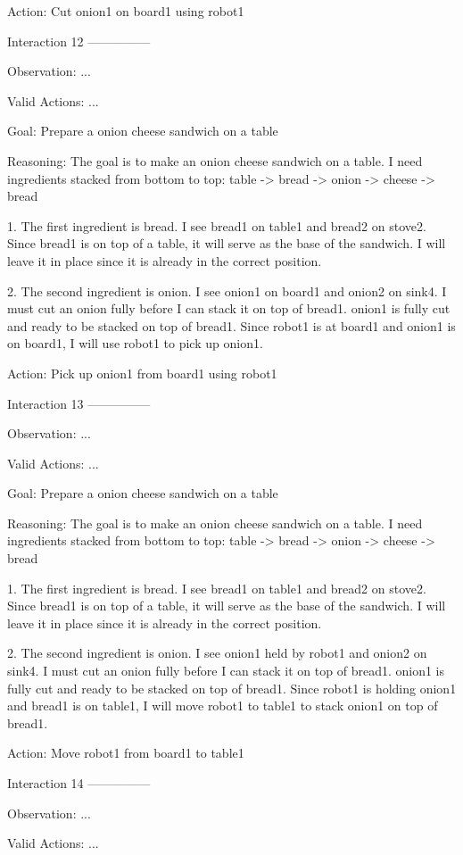 Action: Cut onion1 on board1 using robot1


Interaction 12
---------------


Observation:
...

Valid Actions:
...

Goal: Prepare a onion cheese sandwich on a table


Reasoning: The goal is to make an onion cheese sandwich on a table. I need ingredients stacked from bottom to top: table -> bread -> onion -> cheese -> bread

1. The first ingredient is bread. I see bread1 on table1 and bread2 on stove2. Since bread1 is on top of a table, it will serve as the base of the sandwich. I will leave it in place since it is already in the correct position.

2. The second ingredient is onion. I see onion1 on board1 and onion2 on sink4. I must cut an onion fully before I can stack it on top of bread1. onion1 is fully cut and ready to be stacked on top of bread1. Since robot1 is at board1 and onion1 is on board1, I will use robot1 to pick up onion1.

Action: Pick up onion1 from board1 using robot1


Interaction 13
---------------


Observation:
...

Valid Actions:
...

Goal: Prepare a onion cheese sandwich on a table


Reasoning: The goal is to make an onion cheese sandwich on a table. I need ingredients stacked from bottom to top: table -> bread -> onion -> cheese -> bread

1. The first ingredient is bread. I see bread1 on table1 and bread2 on stove2. Since bread1 is on top of a table, it will serve as the base of the sandwich. I will leave it in place since it is already in the correct position.

2. The second ingredient is onion. I see onion1 held by robot1 and onion2 on sink4. I must cut an onion fully before I can stack it on top of bread1. onion1 is fully cut and ready to be stacked on top of bread1. Since robot1 is holding onion1 and bread1 is on table1, I will move robot1 to table1 to stack onion1 on top of bread1.

Action: Move robot1 from board1 to table1


Interaction 14
---------------


Observation:
...

Valid Actions:
...

